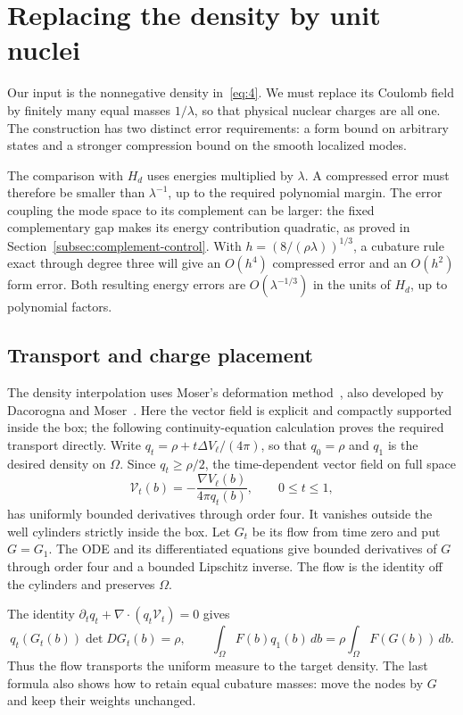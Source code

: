 \section{Replacing the density by unit nuclei}\label{sec:nuclei}

Our input is the nonnegative density in~\eqref{eq:4}. We must replace its
Coulomb field by finitely many equal masses $1/\lambda$, so that physical
nuclear charges are all one. The construction has two distinct error
requirements: a form bound on arbitrary states and a stronger
compression bound on the smooth localized modes.

The comparison with \(H_d\) uses energies multiplied by \(\lambda\).
A compressed error must therefore be smaller than \(\lambda^{-1}\),
up to the required polynomial margin. The error coupling the mode space
to its complement can be larger: the fixed complementary gap makes its
energy contribution quadratic, as proved in
Section~\ref{subsec:complement-control}. With
\(h=(8/(\rho\lambda))^{1/3}\), a cubature rule exact through degree
three will give an \(O(h^4)\) compressed error and an \(O(h^2)\) form
error. Both resulting energy errors are \(O(\lambda^{-1/3})\) in
the units of \(H_d\), up to polynomial factors.

\subsection{Transport and charge placement}\label{subsec:charge-placement}

The density interpolation uses Moser's deformation
method~\cite[Section 4]{Moser1965}, also developed by Dacorogna and
Moser~\cite[Section II, Lemma 3]{DacorognaMoser1990}. Here the vector
field is explicit and compactly supported inside the box; the following
continuity-equation calculation proves the required transport directly.
Write
\(q_t=\rho+t\Delta V_\ell/(4\pi)\), so that \(q_0=\rho\)
and \(q_1\) is the desired density on \(\Omega\). Since
\(q_t\ge\rho/2\), the time-dependent vector field on full space
\[
 \mathcal V_t(b)=-\frac{\nabla V_\ell(b)}{4\pi q_t(b)},
 \qquad 0\le t\le1,
\]
has uniformly bounded derivatives through order four. It vanishes
outside the well cylinders strictly inside the box. Let \(G_t\) be its
flow from time zero and put \(G=G_1\). The ODE and its differentiated
equations give bounded derivatives of \(G\) through order four and a
bounded Lipschitz inverse. The flow is the identity off the cylinders
and preserves \(\Omega\).

The identity \(\partial_t q_t+\nabla\cdot(q_t\mathcal V_t)=0\)
gives
\[
 q_t(G_t(b))\det DG_t(b)=\rho,\qquad
 \int_\Omega F(b)q_1(b)\,db
       =\rho\int_\Omega F(G(b))\,db.
\]
Thus the flow transports the uniform measure to the target density.
The last formula also shows how to retain equal cubature masses:
move the nodes by \(G\) and keep their weights unchanged.

